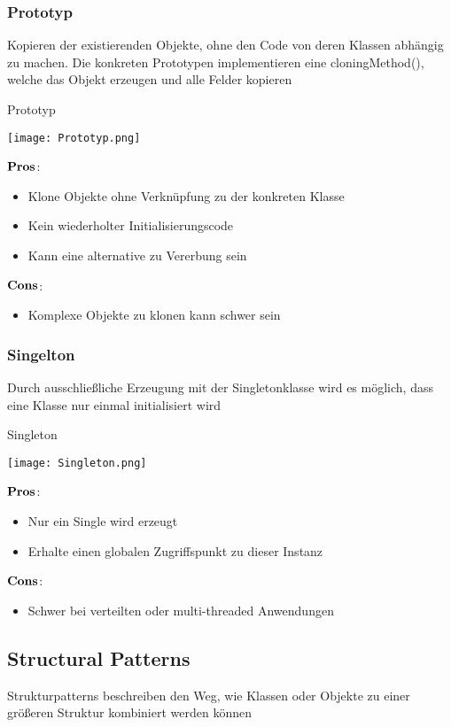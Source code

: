\subsubsection{Prototyp}
Kopieren der existierenden Objekte, ohne den Code von deren Klassen abhängig zu machen. Die konkreten Prototypen implementieren eine cloningMethod(), welche das Objekt erzeugen und alle Felder kopieren
\begin{table}[H]
\caption{Prototyp}
\texttt{[image: Prototyp.png]}	
\end{table}
\begin{multicols}{2}
$\bold{Pros}$:
\begin{itemize}
	\item Klone Objekte ohne Verknüpfung zu der konkreten Klasse
	\item Kein wiederholter Initialisierungscode 
	\item Kann eine alternative zu Vererbung sein  
\end{itemize}
\columnbreak	
$\bold{Cons}$:
\begin{itemize}
	\item Komplexe Objekte zu klonen kann schwer sein
\end{itemize}
\end{multicols}
\subsubsection{Singelton}
Durch ausschließliche Erzeugung mit der Singletonklasse wird es möglich, dass eine Klasse nur einmal initialisiert wird 
\begin{table}[H]
\caption{Singleton}
\texttt{[image: Singleton.png]}	
\end{table}
\begin{multicols}{2}
$\bold{Pros}$:
\begin{itemize}
	\item Nur ein Single wird erzeugt
	\item Erhalte einen globalen Zugriffspunkt zu dieser Instanz
\end{itemize}
\columnbreak
$\bold{Cons}$:
\begin{itemize}
	\item Schwer bei verteilten oder multi-threaded Anwendungen
\end{itemize}
\end{multicols}
\subsection{Structural Patterns}
Strukturpatterns beschreiben den Weg, wie Klassen oder Objekte zu einer größeren Struktur kombiniert werden können  

